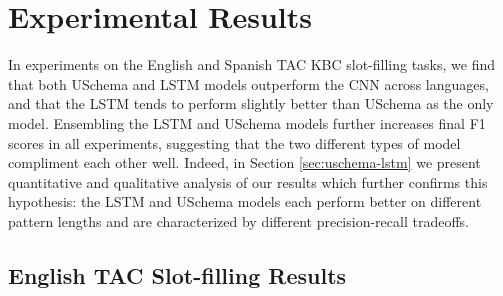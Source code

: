 \section{Experimental Results\label{sec:results}}

In experiments on the English and Spanish TAC KBC slot-filling tasks, we find that both USchema and LSTM models outperform the CNN across languages, and that the LSTM tends to perform slightly better than USchema as the only model. Ensembling the LSTM and USchema models further increases final F1 scores in all experiments, suggesting that the two different types of model compliment each other well. Indeed, in Section \ref{sec:uschema-lstm} we present quantitative and qualitative analysis of our results which further confirms this hypothesis:  the LSTM and USchema models each perform better on different pattern lengths and are characterized by different precision-recall tradeoffs.

\subsection {English TAC Slot-filling Results}


